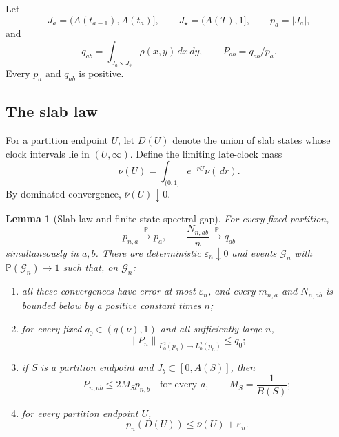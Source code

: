 \documentclass[11pt]{article}
\newtheorem{lemma}[theorem]{Lemma}
\theoremstyle{definition}
\theoremstyle{remark}
\newcommand{\Pp}{\mathbb P}
\newcommand{\dd}{\,d}
\newcommand{\eps}{\varepsilon}
\newcommand{\cG}{\mathcal G}
\newcommand{\norm}[1]{\left\lVert#1\right\rVert}
\begin{document}
Let
\[
 J_a=(A(t_{a-1}),A(t_a)],\qquad J_\star=(A(T),1],
 \qquad p_a=|J_a|,
\]
and
\begin{equation}
 q_{ab}=\int_{J_a\times J_b}\rho(x,y)\dd x\dd y,
 \qquad P_{ab}=q_{ab}/p_a.
 \label{eq:limit-slab-matrix}
\end{equation}
Every $p_a$ and $q_{ab}$ is positive.

\subsection{The slab law}

For a partition endpoint $U$, let $D(U)$ denote the union of slab states whose
clock intervals lie in $(U,\infty)$.  Define the limiting late-clock mass
\begin{equation}
  \overline\nu(U)=\int_{(0,1]}e^{-rU}\nu(\dd r).
  \label{eq:tail-mass}
\end{equation}
By dominated convergence, $\overline\nu(U)\downarrow0$.

\begin{lemma}[Slab law and finite-state spectral gap]
\label{lem:slab-law}
For every fixed partition,
\[
 p_{n,a}\xrightarrow{\Pp}p_a,
 \qquad
 \frac{N_{n,ab}}n\xrightarrow{\Pp}q_{ab}
\]
simultaneously in $a,b$.  There are deterministic $\eps_n\downarrow0$ and
events $\cG_n$ with $\Pp(\cG_n)\to1$ such that, on $\cG_n$:
\begin{enumerate}[label=(\roman*)]
\item all these convergences have error at most $\eps_n$, and every
      $m_{n,a}$ and $N_{n,ab}$ is bounded below by a positive constant times
      $n$;
\item for every fixed $q_0\in(q(\nu),1)$ and all sufficiently large $n$,
\begin{equation}
 \norm{P_n}_{L^2_0(p_n)\to L^2_0(p_n)}\le q_0;
 \label{eq:finite-gap}
\end{equation}
\item if $S$ is a partition endpoint and $J_b\subset[0,A(S)]$, then
\begin{equation}
  P_{n,ab}\le 2M_Sp_{n,b}
  \quad\text{for every }a,
  \qquad M_S=\frac1{B(S)};
  \label{eq:inner-column}
\end{equation}
\item for every partition endpoint $U$,
\begin{equation}
  p_n(D(U))\le \overline\nu(U)+\eps_n.
  \label{eq:finite-tail-mass}
\end{equation}
\end{enumerate}
\end{lemma}
\end{document}
